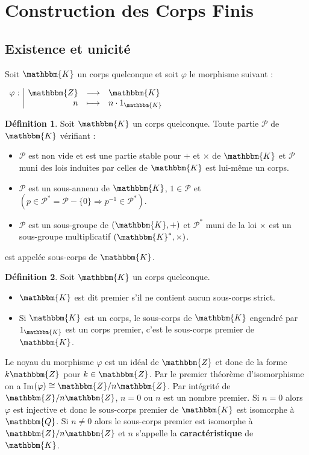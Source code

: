 \documentclass[12pt]{article}
\theoremstyle{remark}\newtheorem{note}{Note}
\theoremstyle{remark}\newtheorem{nota}{Notation}
\newcommand{\Z}{\mathbbm{Z}}
\newcommand{\Q}{\mathbbm{Q}}
\newcommand{\K}{\mathbbm{K}}
\theoremstyle{definition}
\newtheorem{definition}{Définition}
\begin{document}
\section{Construction des Corps Finis}
\subsection{Existence et unicité}
\vspace{12pt}
Soit $\K$ un corps quelconque et soit $\varphi$ le morphisme suivant :
\begin{center}
$
\begin{array}{l|rcl}
\varphi : & \Z & \longrightarrow & \K \\
    & n & \longmapsto & n\cdot 1_{\K}
\end{array}
$
\end{center}
\vspace{12pt}
\begin{definition}
Soit $\K$ un corps quelconque. Toute partie $\mathcal{P}$ de $\K$ vérifiant :
\begin{itemize}
\item $\mathcal{P}$ est non vide et est une partie stable pour $+$ et $\times$ de $\K$ et $\mathcal{P}$ muni des lois induites par celles de $\K$ est lui-même un corps.
\item $\mathcal{P}$ est un sous-anneau de $\K$, $1 \in \mathcal{P}$ et $(p \in \mathcal{P}^{*} = \mathcal{P} - \{0 \} \Rightarrow p^{-1} \in \mathcal{P}^{*})$.
\item $\mathcal{P}$ est un sous-groupe de $(\K, +)$ et $\mathcal{P}^{*}$ muni de la loi $\times$ est un sous-groupe multiplicatif $(\K^{*}, \times)$.
\end{itemize}
est appelée sous-corps de $\K$.
\end{definition}
\vspace{12pt}
\begin{definition}
Soit $\K$ un corps quelconque.
\begin{itemize}
\item $\K$ est dit premier s'il ne contient aucun sous-corps strict.
\item Si $\K$ est un corps, le sous-corps de $\K$ engendré par $1_{\mathbbm{K}}$ est un corps premier, c'est le sous-corps premier de $\K$.
\end{itemize}
\end{definition}
\vspace{12pt}
Le noyau du morphisme $\varphi$ est un idéal de $\Z$ et donc de la forme $k\Z$ pour $k \in \Z$. Par le premier théorème d'isomorphisme on a Im$(\varphi) \cong \Z / n \Z$. Par intégrité de $\Z / n \Z$, $n=0$ ou $n$ est un nombre premier. Si $n=0$ alors $\varphi$ est injective et donc le sous-corps premier de $\K$ est isomorphe à $\Q$. Si $n \neq 0$ alors le sous-corps premier est isomorphe à $\Z / n \Z$ et $n$ s'appelle la \textbf{caractéristique} de $\K$. 
\\
\end{document}
